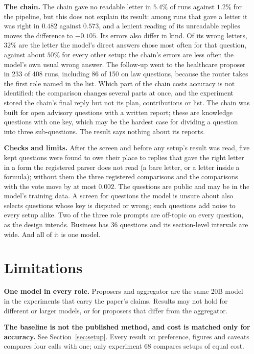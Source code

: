 \documentclass[10pt,twocolumn]{article}
\begin{document}
\textbf{The chain.} The chain gave no readable letter in $5.4\%$ of runs
against $1.2\%$ for the pipeline, but this does not explain its result:
among runs that gave a letter it was right in $0.482$ against $0.573$,
and a lenient reading of its unreadable replies moves the difference to
$-0.105$. Its errors also differ in kind. Of its wrong letters, $32\%$
are the letter the model's direct answers chose most often for that
question, against about $50\%$ for every other setup: the chain's errors
are less often the model's own usual wrong answer.
The follow-up went to the healthcare proposer in 233 of 408 runs,
including 86 of 150 on law questions, because the router takes the
first role named in the list. Which part of the chain costs accuracy is
not identified: the comparison changes several parts at once, and the
experiment stored the chain's final reply but not its plan,
contributions or list. The chain was built for open advisory questions
with a written report; these are knowledge questions with one key, which
may be the hardest case for dividing a question into three
sub-questions. The result says nothing about its reports.

\textbf{Checks and limits.} After the screen and before any setup's
result was read, five kept questions were found to owe their place to
replies that gave the right letter in a form the registered parser does
not read (a bare letter, or a letter inside a formula); without them
the three registered comparisons and the comparisons with the vote move
by at most $0.002$. The questions are
public and may be in the model's training data. A screen for questions
the model is unsure about also selects questions whose key is disputed
or wrong; such questions add noise to every setup alike. Two of the
three role prompts are off-topic on every question, as the design
intends. Business has 36 questions and its section-level intervals are
wide. And all of it is one model.

\section{Limitations}
\label{sec:limits}

\textbf{One model in every role.} Proposers and aggregator are the same
20B model in the experiments that carry the paper's claims. Results may
not hold for different or larger models, or for proposers that differ
from the aggregator.

\textbf{The baseline is not the published method, and cost is matched
only for accuracy.} See Section~\ref{sec:setup}. Every result on
preference, figures and caveats compares four calls with one; only
experiment 68 compares setups of equal cost.
\end{document}
